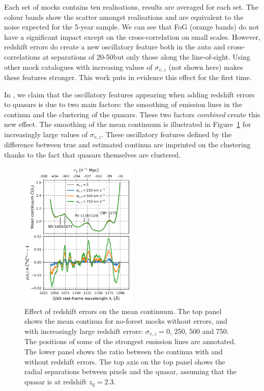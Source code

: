 Each set of mocks contains ten realisations, results are averaged for each set.
The colour bands show the scatter amongst realisations and are equivalent to the
noise expected for the 5-year sample. We can see that FoG (orange bands) do not 
have a significant impact except on the cross-correlation on small scales. 
However, redshift errors do create a new oscillatory feature both in the auto 
and cross-correlations at separations of 20-50\hmpc but only those along the 
line-of-sight. Using other mock catalogues with increasing values of 
$\sigma_{v, z}$ (not shown here) makes these features stronger. 
This work puts in evidence this effect for the first time. 

In \cite{youlesEffectQuasarRedshift2022a}, we claim that the oscillatory
features appearing when adding redshift errors to quasars is due to 
two main factors: the smoothing of emission lines in the continua and 
the clustering of the quasars. These two factors \emph{combined} create this new 
effect. The smoothing of the mean continuum is illustrated in Figure~\ref{fig:zerrors_continua}
for increasingly large values of $\sigma_{v, z}$. These oscillatory features 
defined by the difference between true and estimated continua are imprinted 
on the clustering thanks to the fact that quasars themselves are clustered. 


\begin{figure}
    \centering 
    \includegraphics[width=0.5\textwidth]{fig/forests/zerros_impact_continua.png}
    \caption{Effect of redshift errors on the mean continuum. 
    The top panel shows the mean continua for no-forest mocks without errors, 
    and with increasingly large redshift errors: $\sigma_{v, z} = 0$, 250, 500 and 750\kms. 
    The positions of some of the strongest emission lines are annotated. 
    The lower panel shows the ratio between the continua with and without redshift errors. 
    The top axis on the top panel shows the radial separations between pixels and the quasar, 
    assuming that the quasar is at redshift $z_q = 2.3$.}
    \label{fig:zerrors_continua}
\end{figure}

